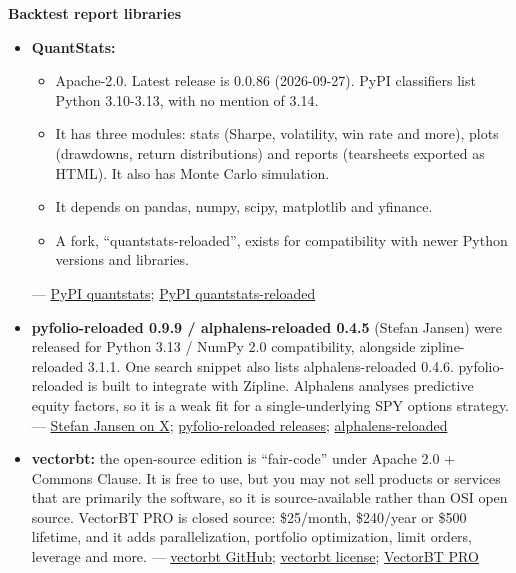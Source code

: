 \documentclass{article}
\begin{document}
\textbf{Backtest report libraries}

\begin{itemize}

\item \textbf{QuantStats:}

\begin{itemize}

\item Apache-2.0. Latest release is 0.0.86 (2026-09-27). PyPI classifiers list Python 3.10-3.13, with no mention of 3.14.

\item It has three modules: stats (Sharpe, volatility, win rate and more), plots (drawdowns, return distributions) and reports (tearsheets exported as HTML). It also has Monte Carlo simulation.

\item It depends on pandas, numpy, scipy, matplotlib and yfinance.

\item A fork, ``quantstats-reloaded'', exists for compatibility with newer Python versions and libraries.

\end{itemize}

--- \href{https://pypi.org/project/quantstats/}{PyPI quantstats}; \href{https://pypi.org/project/quantstats-reloaded/}{PyPI quantstats-reloaded}

\item \textbf{pyfolio-reloaded 0.9.9 /\allowbreak{} alphalens-reloaded 0.4.5} (Stefan Jansen) were released for Python 3.13 /\allowbreak{} NumPy 2.0 compatibility, alongside zipline-reloaded 3.1.1. One search snippet also lists alphalens-reloaded 0.4.6. pyfolio-reloaded is built to integrate with Zipline. Alphalens analyses predictive equity factors, so it is a weak fit for a single-underlying SPY options strategy. --- \href{https://x.com/ml4trading/status/1948303607729631620}{Stefan Jansen on X}; \href{https://github.com/stefan-jansen/pyfolio-reloaded/releases}{pyfolio-reloaded releases}; \href{https://github.com/stefan-jansen/alphalens-reloaded}{alphalens-reloaded}

\item \textbf{vectorbt:} the open-source edition is ``fair-code'' under Apache 2.0 + Commons Clause. It is free to use, but you may not sell products or services that are primarily the software, so it is source-available rather than OSI open source. VectorBT PRO is closed source: \$25/\allowbreak{}month, \$240/\allowbreak{}year or \$500 lifetime, and it adds parallelization, portfolio optimization, limit orders, leverage and more. --- \href{https://github.com/polakowo/vectorbt}{vectorbt GitHub}; \href{https://vectorbt.dev/terms/license/}{vectorbt license}; \href{https://vectorbt.pro/}{VectorBT PRO}

\end{itemize}
\end{document}
